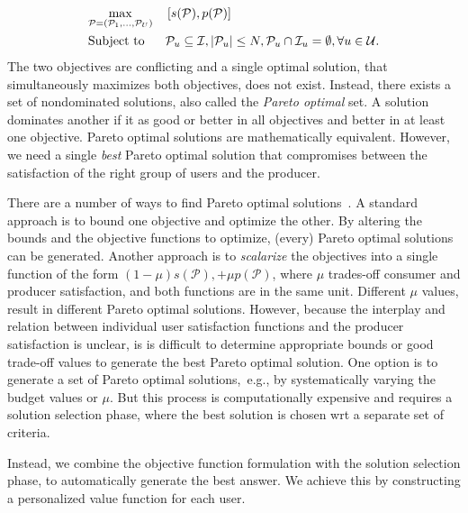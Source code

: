 \begin{equation}
\begin{aligned}
\small
& \underset{ \mathcal{P} = (\mathcal{P}_1 , ..., \mathcal{P}_U)} {\max}  
& & \left [ s(\mathcal{P}),  p(\mathcal{P}) \right] \\  
& \text{Subject to} 
& & \mathcal{P}_{u} \subseteq \mathcal{I}, |\mathcal{P}_{u}| \leq N, \mathcal{P}_{u} \cap \mathcal{I}_{u} = \emptyset, \forall u \in \mathcal{U}. 
\end{aligned}
\label{eq:bijectiveOpt}
\end{equation}
 The two objectives are conflicting and a single optimal solution, that simultaneously maximizes both objectives, does not exist. Instead, there exists a set of nondominated solutions, also called the \textit{Pareto optimal} set. A solution dominates another if it as good or better in all objectives and better in at least one objective\cite{boyd2004convex}. Pareto optimal solutions are mathematically equivalent. However, we need a single \textit{best} Pareto optimal solution that compromises between the satisfaction of the right group of users and the producer. 

There are a number of ways to find Pareto optimal solutions~\cite{boyd2004convex,  hwang2012multiple, miettinen2012nonlinear}. A standard approach is to bound one objective and optimize the other.  By altering the  bounds and the objective functions to optimize, (every) Pareto optimal solutions can be generated.  Another approach is to \textit{scalarize} the objectives into a single function of the form  $(1-\mu)s(\mathcal{P}),  + \mu  p(\mathcal{P})$, where $\mu$ trades-off consumer and producer satisfaction, and both functions are in the same unit. Different $\mu$ values, result in different Pareto optimal solutions. However, because the interplay and relation between individual user satisfaction functions and the producer satisfaction is unclear, is is difficult to determine appropriate bounds or good trade-off values to generate the best Pareto optimal solution.  One option is to generate a set of Pareto optimal solutions,~e.g., by  systematically varying the budget values or $\mu$. But this process  is computationally expensive and requires a solution selection phase, where the  best solution is chosen wrt a separate set of criteria.

Instead, we combine the objective function formulation with the solution selection phase, to automatically generate the best answer. We achieve this by constructing a personalized value function for each user. 

